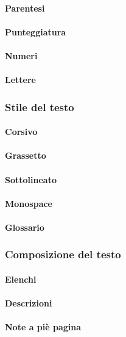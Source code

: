\documentclass[../NormeProgetto.tex]{subfiles}
\begin{document}
			\paragraph{Parentesi}
			\paragraph{Punteggiatura}
			\paragraph{Numeri}
			\paragraph{Lettere}
		\subsubsection{Stile del testo}
			\paragraph{Corsivo}
			\paragraph{Grassetto}
			\paragraph{Sottolineato}
			\paragraph{Monospace}
			\paragraph{Glossario}
		\subsubsection{Composizione del testo}
			\paragraph{Elenchi}
			\paragraph{Descrizioni}
			\paragraph{Note a piè pagina}
\end{document}
